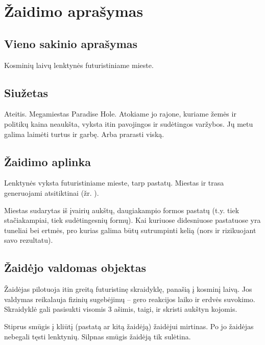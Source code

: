 \section{Žaidimo aprašymas}
\subsection{Vieno sakinio aprašymas}

Kosminių laivų lenktynės futuristiniame mieste.

\subsection{Siužetas}

Ateitis.
Megamiestas Paradise Hole.
Atokiame jo rajone, kuriame žemės ir politikų kaina neaukšta, vyksta itin pavojingos ir sudėtingos varžybos.
Jų metu galima laimėti turtus ir garbę.
Arba prarasti viską.

\subsection{Žaidimo aplinka}

Lenktynės vyksta futuristiniame mieste, tarp pastatų.
Miestas ir trasa generuojami atsitiktinai (žr. ).


Miestas sudarytas iš įvairių aukštų, daugiakampio formos pastatų (t.y. tiek stačiakampiai, tiek sudėtingesnių formų).
Kai kuriuose didesniuose pastatuose yra tuneliai bei ertmės, pro kurias galima būtų sutrumpinti kelią (nors ir rizikuojant savo rezultatu).

\subsection{Žaidėjo valdomas objektas}

Žaidėjas pilotuoja itin greitą futuristinę skraidyklę, panašią į kosminį laivą.
Jos valdymas reikalauja fizinių sugebėjimų -- gero reakcijos laiko ir erdvės suvokimo.
Skraidyklė gali pasisukti visomis 3 ašimis, taigi, ir skristi aukštyn kojomis.

Stiprus smūgis į kliūtį (pastatą ar kitą žaidėją) žaidėjui mirtinas.
Po jo žaidėjas nebegali tęsti lenktynių.
Silpnas smūgis žaidėją tik sulėtina.
